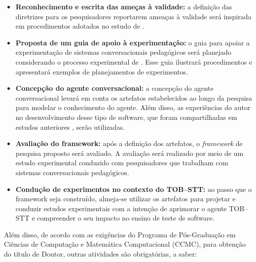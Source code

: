 \begin{itemize}
\item \textbf{Reconhecimento e escrita das ameças à validade:} a definição das diretrizes para os pesquisadores reportarem ameaças à validade será inspirada em procedimentos adotados no estudo de . 

\item \textbf{Proposta de um guia de apoio à experimentação:} o guia para apoiar a experimentação de sistemas conversacionais pedagógicos será planejado considerando o processo experimental de . Esse guia ilustrará procedimentos e apresentará exemplos de planejamentos de experimentos.  

\item \textbf{Concepção do agente conversacional:} a concepção do agente conversacional levará em conta os artefatos estabelecidos ao longo da pesquisa para modelar o conhecimento do agente. Além disso, as experiências do autor no desenvolvimento desse tipo de software, que foram compartilhadas em estudos anteriores \cite{Paschoal:2019, paschoal2018}, serão utilizadas.

\item \textbf{Avaliação do framework:} após a definição dos artefatos, o \textit{framework} de pesquisa proposto será avaliado. A avaliação será realizado por meio de um estudo experimental conduzido com pesquisadores que trabalham com sistemas conversacionais pedagógicos.

\item \textbf{Condução de experimentos no contexto do TOB--STT: } ao passo que o framework seja construído, almeja-se utilizar os artefatos para projetar e conduzir estudos experimentais com a intenção de aprimorar o agente TOB--STT e compreender o seu impacto no ensino de teste de software.

\end{itemize}


Além disso, de acordo com as exigências do Programa de Pós-Graduação em Ciências de Computação e Matemática Computacional (CCMC), para obtenção do título de Doutor, outras atividades são obrigatórias, a saber:

